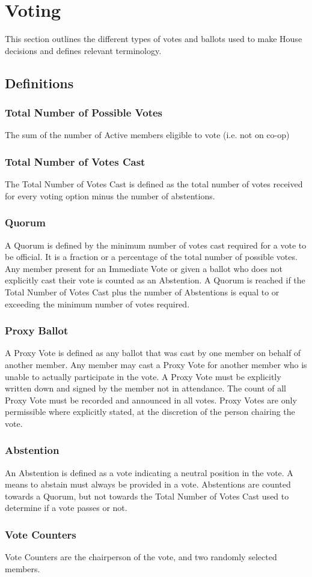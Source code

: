 \documentclass{article}
\newcommand{\article}[1]{\section{#1} \label{#1}}
\newcommand{\asection}[1]{\subsection{#1} \label{#1}}
\newcommand{\asubsection}[1]{\subsubsection{#1} \label{#1}}
\begin{document}
\article{Voting}
This section outlines the different types of votes and ballots used to make House decisions and defines relevant terminology.
\asection{Definitions}
\asubsection{Total Number of Possible Votes}
The sum of the number of Active members eligible to vote (i.e. not on co-op)
\asubsection{Total Number of Votes Cast}
The Total Number of Votes Cast is defined as the total number of votes received for every voting option minus the number of abstentions.
\asubsection{Quorum}
A Quorum is defined by the minimum number of votes cast required for a vote to be official. It is a fraction or a percentage of the total number of possible votes. Any member present for an Immediate Vote or given a ballot who does not explicitly cast their vote is counted as an Abstention. A Quorum is reached if the Total Number of Votes Cast plus the number of Abstentions is equal to or exceeding the minimum number of votes required.
\asubsection{Proxy Ballot}
A Proxy Vote is defined as any ballot that was cast by one member on behalf of another member. Any member may cast a Proxy Vote for another member who is unable to actually participate in the vote. A Proxy Vote must be explicitly written down and signed by the member not in attendance. The count of all Proxy Vote must be recorded and announced in all votes. Proxy Votes are only permissible where explicitly stated, at the discretion of the person chairing the vote.
\asubsection{Abstention}
An Abstention is defined as a vote indicating a neutral position in the vote. A means to abstain must always be provided in a vote. Abstentions are counted towards a Quorum, but not towards the Total Number of Votes Cast used to determine if a vote passes or not.
\asubsection{Vote Counters}
Vote Counters are the chairperson of the vote, and two randomly selected members.
\end{document}
